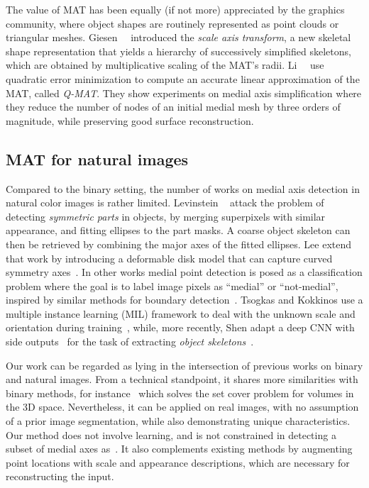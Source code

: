 \documentclass[10pt,twocolumn,letterpaper]{article}
\begin{document}
The value of MAT has been equally (if not more) appreciated by the graphics community, where object shapes 
are routinely represented as point clouds or triangular meshes.
Giesen~\etal~\cite{giesen2009scale} introduced the \emph{scale axis transform}, a new skeletal shape representation
that yields a hierarchy of successively simplified skeletons, which are obtained by multiplicative scaling of the
MAT's radii.
Li~\etal~\cite{li2015q} use quadratic error minimization to compute an accurate linear approximation of the MAT, called \emph{Q-MAT}.
They show experiments on medial axis simplification where they reduce the number of nodes of an initial medial mesh
by three orders of magnitude, while preserving good surface reconstruction.


\subsection{MAT for natural images}\label{sec:related:natural}
Compared to the binary setting, the number of works on medial axis detection in natural color images is rather limited.
Levinstein \etal~\cite{levinshtein2009multiscale} attack the problem of detecting \emph{symmetric parts} in objects,
by merging superpixels with similar appearance, and fitting ellipses to the part masks.
A coarse object skeleton can then be retrieved by combining the major axes of the fitted ellipses.
Lee \etal extend that work by introducing a deformable disk model that can capture curved symmetry axes~\cite{lee2013detecting}.
In other works medial point detection is posed as a classification problem where the goal is to label image pixels
as ``medial'' or ``not-medial'', inspired by similar methods for boundary detection~\cite{martin2004learning,arbelaez2011contour}.
Tsogkas and Kokkinos use a multiple instance learning (MIL) framework to deal with the unknown scale and orientation 
during training~\cite{tsogkas2012learning}, while, more recently, Shen \etal adapt a deep CNN with 
side outputs~\cite{xie2015holistically} for the task of extracting \emph{object skeletons}~\cite{shen2016object}.

Our work can be regarded as lying in the intersection of previous works on binary and natural images.
From a technical standpoint, it shares more similarities with binary methods, for instance~\cite{stolpner2012medial}
which solves the set cover problem for volumes in the 3D space.
Nevertheless, it can be applied on real images, with no assumption of a prior image segmentation,
while also demonstrating unique characteristics.
Our method does not involve learning, and is not constrained in detecting a subset of medial axes as~\cite{tsogkas2012learning,shen2016object}.
It also complements existing methods by augmenting point locations with scale and appearance descriptions, which
are necessary for reconstructing the input.
\end{document}
